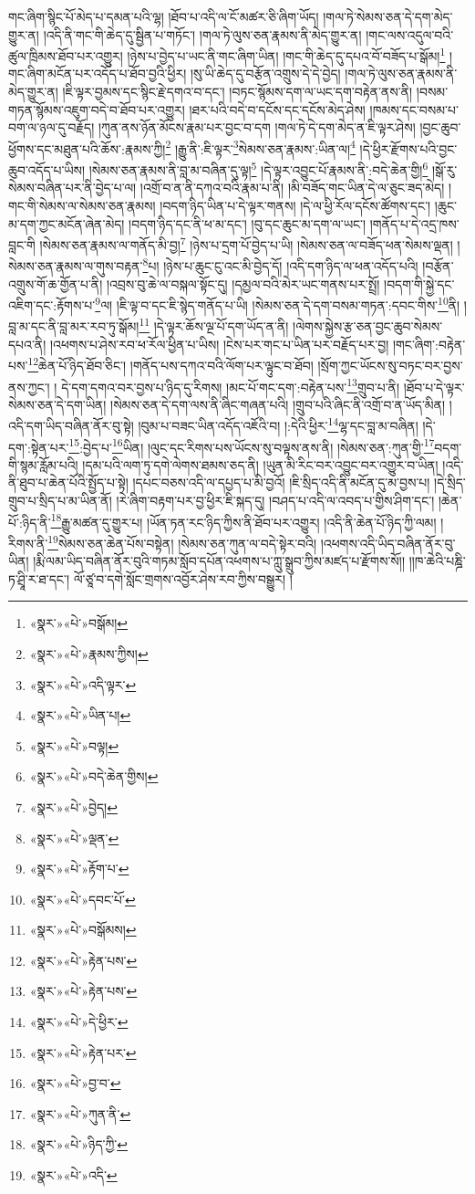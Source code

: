 གང་ཞིག་སྙིང་པོ་མེད་པ་དམན་པའི་ལྷ། །ཐོབ་པ་འདི་ལ་ངོ་མཚར་ཅི་ཞིག་ཡོད། །གལ་ཏེ་སེམས་ཅན་དེ་དག་མེད་གྱུར་ན། །འདི་ནི་གང་གི་ཆེད་དུ་སྦྱིན་པ་གཏོང་། །གལ་ཏེ་ལུས་ཅན་རྣམས་ནི་མེད་གྱུར་ན། །གང་ལས་འདུལ་བའི་ཚུལ་ཁྲིམས་ཐོབ་པར་འགྱུར། །ཉེས་པ་བྱེད་པ་ཡང་ནི་གང་ཞིག་ཡིན། །གང་གི་ཆེད་དུ་དཔའ་བོ་བཟོད་པ་སྒོམ།\footnote{«སྣར་»«པེ་»བསྒོམ།} །གང་ཞིག་མངོན་པར་འདོད་པ་ཐོབ་བྱའི་ཕྱིར། །སུ་ཡི་ཆེད་དུ་བརྩོན་འགྲུས་དེ་དེ་བྱེད། །གལ་ཏེ་ལུས་ཅན་རྣམས་ནི་མེད་གྱུར་ན། །ཇི་ལྟར་བྱམས་དང་སྙིང་རྗེ་དགའ་བ་དང་། །བཏང་སྙོམས་དག་ལ་ཡང་དག་བརྟེན་ནས་ནི། །བསམ་གཏན་སྙོམས་འཇུག་བདེ་བ་ཐོབ་པར་འགྱུར། །ཐར་པའི་བདེ་བ་དངོས་དང་དངོས་མེད་ཤེས། །ཁམས་དང་བསམ་པ་བག་ལ་ཉལ་དུ་བརྗོད། །ཀུན་ནས་ཉོན་མོངས་རྣམ་པར་བྱང་བ་དག །གལ་ཏེ་དེ་དག་མེད་ན་ཇི་ལྟར་ཤེས། །བྱང་ཆུབ་ཕྱོགས་དང་མཐུན་པའི་ཆོས་:རྣམས་ཀྱི།\footnote{«སྣར་»«པེ་»རྣམས་ཀྱིས།} །རྒྱུ་ནི་:ཇི་ལྟར་\footnote{«སྣར་»«པེ་»འདི་ལྟར་}སེམས་ཅན་རྣམས་:ཡིན་ལ།\footnote{«སྣར་»«པེ་»ཡིན་པ།} །དེ་ཕྱིར་རྫོགས་པའི་བྱང་ཆུབ་འདོད་པ་ཡིས། །སེམས་ཅན་རྣམས་ནི་བླ་མ་བཞིན་དུ་ལྟ།\footnote{«སྣར་»«པེ་»བལྟ།} །དེ་ལྟར་འབྱུང་པོ་རྣམས་ནི་:བདེ་ཆེན་གྱི།\footnote{«སྣར་»«པེ་»བདེ་ཆེན་གྱིས།} །སྒོ་རུ་སེམས་བཞིན་པར་ནི་བྱེད་པ་ལ། །འགྲོ་བ་ན་ནི་དཀའ་བའི་རྣམ་པ་ནི། །མི་བཟོད་གང་ཡིན་དེ་ལ་ཅུང་ཟད་མེད། །གང་གི་སེམས་ལ་སེམས་ཅན་རྣམས། །བདག་ཉིད་ཡིན་པ་དེ་ལྟར་གནས། །དེ་ལ་ཕྱི་རོལ་དངོས་ཚོགས་དང་། །ཆུང་མ་དག་ཀྱང་མངོན་ཞེན་མེད། །བདག་ཉིད་དང་ནི་ཕ་མ་དང་། །བུ་དང་ཆུང་མ་དག་ལ་ཡང་། །གནོད་པ་དེ་འདྲ་ཁས་བླང་གི །སེམས་ཅན་རྣམས་ལ་གནོད་མི་བྱ།\footnote{«སྣར་»«པེ་»བྱེད།} །ཉེས་པ་དྲག་པོ་བྱེད་པ་ཡི། །སེམས་ཅན་ལ་བཟོད་ཕན་སེམས་ལྡན། །སེམས་ཅན་རྣམས་ལ་གུས་བརྟན་\footnote{«སྣར་»«པེ་»ལྡན་}པ། །ཉེས་པ་ཆུང་ངུ་འང་མི་བྱེད་དོ། །འདི་དག་ཉིད་ལ་ཕན་འདོད་པའི། །བརྩོན་འགྲུས་གོ་ཆ་གྱོན་པ་ནི། །འབྲས་བུ་ཆེ་ལ་བསྐལ་སྟོང་དུ། །དམྱལ་བའི་མེར་ཡང་གནས་པར་སྤྲོ། །བདག་གི་སྐྱེ་དང་འཇིག་དང་:རྟོགས་པ་\footnote{«སྣར་»«པེ་»རྟོག་པ་}ལ། །ཇི་ལྟ་བ་དང་ཇི་སྙེད་གནོད་པ་ཡི། །སེམས་ཅན་དེ་དག་བསམ་གཏན་:དབང་གིས་\footnote{«སྣར་»«པེ་»དབང་པོ་}ནི། །བླ་མ་དང་ནི་བླ་མར་རབ་ཏུ་སྒོམ།\footnote{«སྣར་»«པེ་»བསྒོམས།} །དེ་ལྟར་ཆོས་ལྔ་པོ་དག་ཡོད་ན་ནི། །ལེགས་སྐྱེས་རྩ་ཅན་བྱང་ཆུབ་སེམས་དཔའ་ནི། །འཕགས་པ་ཤེས་རབ་ཕ་རོལ་ཕྱིན་པ་ཡིས། །ངེས་པར་གང་པ་ཡིན་པར་བརྗོད་པར་བྱ། །གང་ཞིག་:བརྟེན་པས་\footnote{«སྣར་»«པེ་»རྟེན་པས་}ཆེན་པོ་ཉིད་ཐོབ་ཅིང་། །གནོད་པས་དཀའ་བའི་ལོག་པར་ལྟུང་བ་ཐོབ། །སྲོག་ཀྱང་ཡོངས་སུ་བཏང་བར་བྱས་ནས་ཀྱང་། །
དེ་དག་དགའ་བར་བྱས་པ་ཉིད་དུ་རིགས། །མང་པོ་གང་དག་:བརྟེན་པས་\footnote{«སྣར་»«པེ་»རྟེན་པས་}གྲུབ་པ་ནི། །ཐོབ་པ་དེ་ལྟར་སེམས་ཅན་དེ་དག་ཡིན། །སེམས་ཅན་དེ་དག་ལས་ནི་ཞིང་གཞན་པའི། །གྲུབ་པའི་ཞིང་ནི་འགྲོ་བ་ན་ཡོད་མིན། །འདི་དག་ཡིད་བཞིན་ནོར་བུ་སྟེ། །བུམ་པ་བཟང་ཡིན་འདོད་འཇོའི་བ། །:དེའི་ཕྱིར་\footnote{«སྣར་»«པེ་»དེ་ཕྱིར་}ལྷ་དང་བླ་མ་བཞིན། །དེ་དག་:སྟེན་པར་\footnote{«སྣར་»«པེ་»རྟེན་པར་}:བྱེད་པ་\footnote{«སྣར་»«པེ་»བྱ་བ་}ཡིན། །ལུང་དང་རིགས་པས་ཡོངས་སུ་བལྟས་ནས་ནི། །སེམས་ཅན་:ཀུན་གྱི་\footnote{«སྣར་»«པེ་»ཀུན་ནི་}བདག་གི་སྙམ་རློམ་པའི། །དམ་པའི་ལག་ཏུ་དགེ་ལེགས་ཐམས་ཅད་ནི། །ཡུན་མི་རིང་བར་འབྱུང་བར་འགྱུར་བ་ཡིན། །འདི་ནི་ཐུབ་པ་ཆེན་པོའི་སྤྱོད་པ་སྟེ། །དཔང་བཅས་འདི་ལ་དཔྱད་པ་མི་བྱའོ། །ཇི་སྲིད་འདི་ནི་མངོན་དུ་མ་བྱས་པ། །དེ་སྲིད་གྲུབ་པ་སྲིད་པ་མ་ཡིན་ནོ། །རེ་ཞིག་བརྟག་པར་བྱ་ཕྱིར་ཇི་སྐད་དུ། །བཤད་པ་འདི་ལ་འབད་པ་གྱིས་ཤིག་དང་། །ཆེན་པོ་:ཉིད་ནི་\footnote{«སྣར་»«པེ་»ཉིད་ཀྱི་}རྒྱུ་མཚན་དུ་གྱུར་པ། །ཡོན་ཏན་རང་ཉིད་ཀྱིས་ནི་ཐོབ་པར་འགྱུར། །འདི་ནི་ཆེན་པོ་ཉིད་ཀྱི་ལམ། །རིགས་ནི་\footnote{«སྣར་»«པེ་»འདི་}སེམས་ཅན་ཆེན་པོས་བསྟེན། །སེམས་ཅན་ཀུན་ལ་བདེ་སྟེར་བའི། །འཕགས་འདི་ཡིད་བཞིན་ནོར་བུ་ཡིན། །རྨི་ལམ་ཡིད་བཞིན་ནོར་བུའི་གཏམ་སློབ་དཔོན་འཕགས་པ་ཀླུ་སྒྲུབ་ཀྱིས་མཛད་པ་རྫོགས་སོ།། །།ཁ་ཆེའི་པཎྜི་ཏ་ཤྲཱི་ར་ཐ་དང་། ལོ་ཙཱ་བ་དགེ་སློང་གྲགས་འབྱོར་ཤེས་རབ་ཀྱིས་བསྒྱུར། ། 